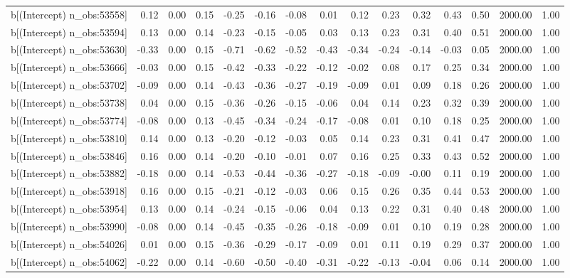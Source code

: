\begin{table}[ht]
\begin{tabular}{rrrrrrrrrrrrrrr}
  b[(Intercept) n\_obs:53558] & 0.12 & 0.00 & 0.15 & -0.25 & -0.16 & -0.08 & 0.01 & 0.12 & 0.23 & 0.32 & 0.43 & 0.50 & 2000.00 & 1.00 \\ 
  b[(Intercept) n\_obs:53594] & 0.13 & 0.00 & 0.14 & -0.23 & -0.15 & -0.05 & 0.03 & 0.13 & 0.23 & 0.31 & 0.40 & 0.51 & 2000.00 & 1.00 \\ 
  b[(Intercept) n\_obs:53630] & -0.33 & 0.00 & 0.15 & -0.71 & -0.62 & -0.52 & -0.43 & -0.34 & -0.24 & -0.14 & -0.03 & 0.05 & 2000.00 & 1.00 \\ 
  b[(Intercept) n\_obs:53666] & -0.03 & 0.00 & 0.15 & -0.42 & -0.33 & -0.22 & -0.12 & -0.02 & 0.08 & 0.17 & 0.25 & 0.34 & 2000.00 & 1.00 \\ 
  b[(Intercept) n\_obs:53702] & -0.09 & 0.00 & 0.14 & -0.43 & -0.36 & -0.27 & -0.19 & -0.09 & 0.01 & 0.09 & 0.18 & 0.26 & 2000.00 & 1.00 \\ 
  b[(Intercept) n\_obs:53738] & 0.04 & 0.00 & 0.15 & -0.36 & -0.26 & -0.15 & -0.06 & 0.04 & 0.14 & 0.23 & 0.32 & 0.39 & 2000.00 & 1.00 \\ 
  b[(Intercept) n\_obs:53774] & -0.08 & 0.00 & 0.13 & -0.45 & -0.34 & -0.24 & -0.17 & -0.08 & 0.01 & 0.10 & 0.18 & 0.25 & 2000.00 & 1.00 \\ 
  b[(Intercept) n\_obs:53810] & 0.14 & 0.00 & 0.13 & -0.20 & -0.12 & -0.03 & 0.05 & 0.14 & 0.23 & 0.31 & 0.41 & 0.47 & 2000.00 & 1.00 \\ 
  b[(Intercept) n\_obs:53846] & 0.16 & 0.00 & 0.14 & -0.20 & -0.10 & -0.01 & 0.07 & 0.16 & 0.25 & 0.33 & 0.43 & 0.52 & 2000.00 & 1.00 \\ 
  b[(Intercept) n\_obs:53882] & -0.18 & 0.00 & 0.14 & -0.53 & -0.44 & -0.36 & -0.27 & -0.18 & -0.09 & -0.00 & 0.11 & 0.19 & 2000.00 & 1.00 \\ 
  b[(Intercept) n\_obs:53918] & 0.16 & 0.00 & 0.15 & -0.21 & -0.12 & -0.03 & 0.06 & 0.15 & 0.26 & 0.35 & 0.44 & 0.53 & 2000.00 & 1.00 \\ 
  b[(Intercept) n\_obs:53954] & 0.13 & 0.00 & 0.14 & -0.24 & -0.15 & -0.06 & 0.04 & 0.13 & 0.22 & 0.31 & 0.40 & 0.48 & 2000.00 & 1.00 \\ 
  b[(Intercept) n\_obs:53990] & -0.08 & 0.00 & 0.14 & -0.45 & -0.35 & -0.26 & -0.18 & -0.09 & 0.01 & 0.10 & 0.19 & 0.28 & 2000.00 & 1.00 \\ 
  b[(Intercept) n\_obs:54026] & 0.01 & 0.00 & 0.15 & -0.36 & -0.29 & -0.17 & -0.09 & 0.01 & 0.11 & 0.19 & 0.29 & 0.37 & 2000.00 & 1.00 \\ 
  b[(Intercept) n\_obs:54062] & -0.22 & 0.00 & 0.14 & -0.60 & -0.50 & -0.40 & -0.31 & -0.22 & -0.13 & -0.04 & 0.06 & 0.14 & 2000.00 & 1.00 \\ 

\end{tabular}
\end{table}
